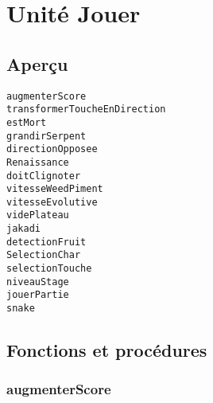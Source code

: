 \documentclass{report}
\newif\ifpdf
\begin{document}
\chapter{Unité Jouer}
\label{Jouer}
\section{Aperçu}
\begin{description}
\item[\texttt{augmenterScore}]
\item[\texttt{transformerToucheEnDirection}]
\item[\texttt{estMort}]
\item[\texttt{grandirSerpent}]
\item[\texttt{directionOpposee}]
\item[\texttt{Renaissance}]
\item[\texttt{doitClignoter}]
\item[\texttt{vitesseWeedPiment}]
\item[\texttt{vitesseEvolutive}]
\item[\texttt{videPlateau}]
\item[\texttt{jakadi}]
\item[\texttt{detectionFruit}]
\item[\texttt{SelectionChar}]
\item[\texttt{selectionTouche}]
\item[\texttt{niveauStage}]
\item[\texttt{jouerPartie}]
\item[\texttt{snake}]
\end{description}
\section{Fonctions et procédures}
\ifpdf
\subsection*{\large{\textbf{augmenterScore}}\normalsize\hspace{1ex}\hrulefill}
\else
\end{document}
